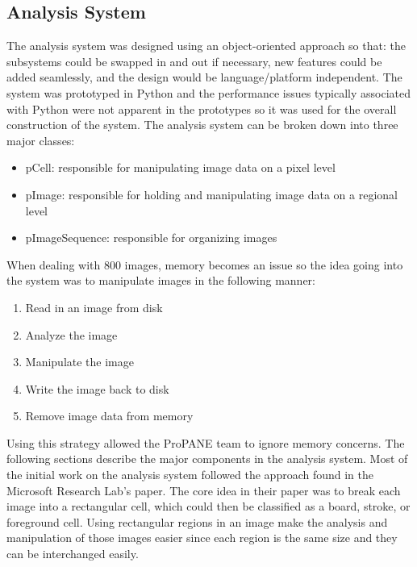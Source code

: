 \documentclass[]{article}
\begin{document}
		\subsection{Analysis System}
			The analysis system was designed using an object-oriented approach so that: the subsystems could be swapped in and out if necessary, new features could be added seamlessly, and the design would be language/platform independent. The system was prototyped in Python and the performance issues typically associated with Python were not apparent in the prototypes so it was used for the overall construction of the system. The analysis system can be broken down into three major classes:
			\begin{itemize}
				\item pCell: responsible for manipulating image data on a pixel level
				\item pImage: responsible for holding and manipulating image data on a regional level
				\item pImageSequence: responsible for organizing images
			\end{itemize}
			When dealing with 800 images, memory becomes an issue so the idea going into the system was to manipulate images in the following manner:
			\begin{enumerate}
				\item Read in an image from disk
				\item Analyze the image
				\item Manipulate the image
				\item Write the image back to disk
				\item Remove image data from memory
			\end{enumerate} 
			Using this strategy allowed the ProPANE team to ignore memory concerns. The following sections describe the major components in the analysis system. Most of the initial work on the analysis system followed the approach found in the Microsoft Research Lab's paper. The core idea in their paper was to break each image into a rectangular cell, which could then be classified as a board, stroke, or foreground cell. Using rectangular regions in an image make the analysis and manipulation of those images easier since each region is the same size and they can be interchanged easily. 
			
\end{document}
